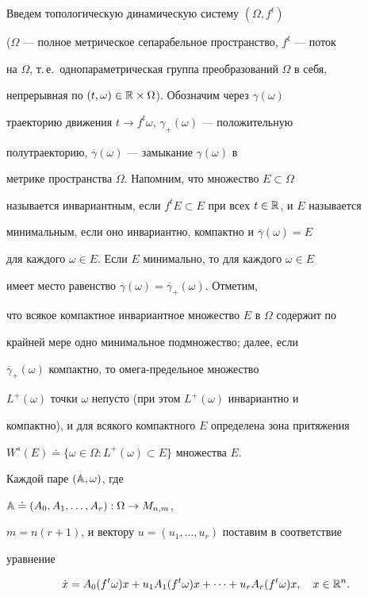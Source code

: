 Введем топологическую динамическую систему $(\Omega,f^t)$


($\Omega$ --- полное  метрическое сепарабельное пространство, $f^t$ --- поток


на $\Omega$, т.\,е.~однопараметрическая группа преобразований $\Omega$ в себя,


непрерывная по $(t,\omega)\in\Bbb R\times\Omega$). Обозначим через $\gamma(\omega)$


траекторию движения $t\to f^t\omega$, $\gamma_+(\omega)$ --- положительную


полутраекторию, $\overline{\gamma}(\omega)$ --- замыкание $\gamma(\omega)$ в


метрике пространства $\Omega$. Напомним, что множество $E\subset\Omega$


называется инвариантным, если $f^t E\subset E$ при всех $t\in\Bbb R$, и $E$ называется


минимальным, если оно инвариантно, компактно и $\overline\gamma(\omega)=E$


для каждого $\omega\in E$. Если $E$ минимально, то для каждого $\omega\in E$


имеет место равенство $\overline\gamma(\omega)=\overline\gamma_+(\omega)$. Отметим,


что всякое компактное инвариантное множество $E$ в $\Omega$ содержит по


крайней мере одно минимальное подмножество; далее, если


$\overline{\gamma}_+(\omega)$ компактно, то омега-предельное множество


$L^+(\omega)$ точки $\omega$ непусто (при этом $L^+(\omega)$ инвариантно и


компактно), и для всякого компактного $E$ определена зона притяжения


$W^s(E)\doteq\{\omega\in\Omega:L^+(\omega)\subset E\}$ множества $E$.





Каждой паре $(\Bbb A,\omega)$, где


$\Bbb A\doteq(A_0,A_1,\dotsc,A_r):\Omega\to M_{n,m}$,


$m=n(r+1)$, и вектору $u=(u_1,\dotsc,u_r)$ поставим в соответствие


уравнение


\begin{equation}


\label{1}


\Dot x=A_0(f^t\omega)x+u_1A_1(f^t\omega)x+\dotsb+


u_rA_r(f^t\omega)x,\quad x\in\R^n.


\end{equation}


